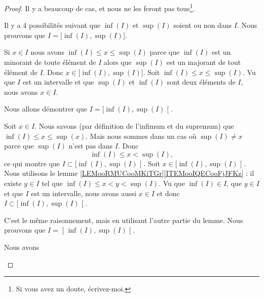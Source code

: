 \begin{proof}
	Il y a beaucoup de cas, et nous ne les feront pas tous\footnote{Si vous avez un doute, écrivez-moi.}.
	\begin{subproof}
		Il y a 4 possibilités suivant que \( \inf(I)\) et \( \sup(I)\) soient ou non dans \( I\).
		Nous prouvons que \( I=\mathopen[ \inf(I) , \sup(I) \mathclose]\).
		\begin{subproof}
			Si \( x\in I\) nous avons \( \inf(I)\leq x\leq \sup(I)\) parce que \( \inf(I)\) est un minorant de toute élément de \( I\) alors que \( \sup(I)\) est un majorant de tout élément de \( I\). Donc \( x\in \mathopen[ \inf(I) , \sup(I) \mathclose]\).
			Soit \( \inf(I)\leq x\leq \sup(I)\). Vu que \( I\) est un intervalle et que \( \sup(I)\) et \( \inf(I)\) sont deux éléments de \( I\), nous avons \( x\in I\).
		\end{subproof}
		Nous allons démontrer que \( I=\mathopen[ \inf(I) , \sup(I) \mathclose[\).
				\begin{subproof}
					Soit \( x\in I\). Nous savons (par définition de l'infimum et du supremum) que \( \inf(I)\leq x\leq \sup(x)\). Mais nous sommes dans un cas où \( \sup(I)\neq x\) parce que \( \sup(I)\) n'est pas dans \( I\). Donc
					\begin{equation}
						\inf(I)\leq x<\sup(I),
					\end{equation}
					ce qui montre que \( I\subset \mathopen[ \inf(I) , \sup(I) \mathclose[\).
					Soit \( x\in\mathopen[ \inf(I) , \sup(I) \mathclose[\). Nous utilisons le lemme \ref{LEMooRMUCooMKiTGr}\ref{ITEMooIQECooFjJFKz} : il existe \( y\in I\) tel que \( \inf(I)\leq x<y<\sup(I)\). Vu que \( \inf(I)\in I\), que \( y\in I\) et que \( I\) est un intervalle, nous avons aussi \( x\in I\) et donc \( I\subset \mathopen[ \inf(I) , \sup(I) \mathclose[\).
				\end{subproof}
				C'est le même raisonnement, mais en utilisant l'autre partie du lemme.
				Nous prouvons que \( I=\mathopen] \inf(I) , \sup(I) \mathclose[\).
				\begin{subproof}
					\spitem[Dans un sens]
					Nous avons
					\begin{equation}

\end{equation}
\end{subproof}
\end{subproof}
\end{proof}
